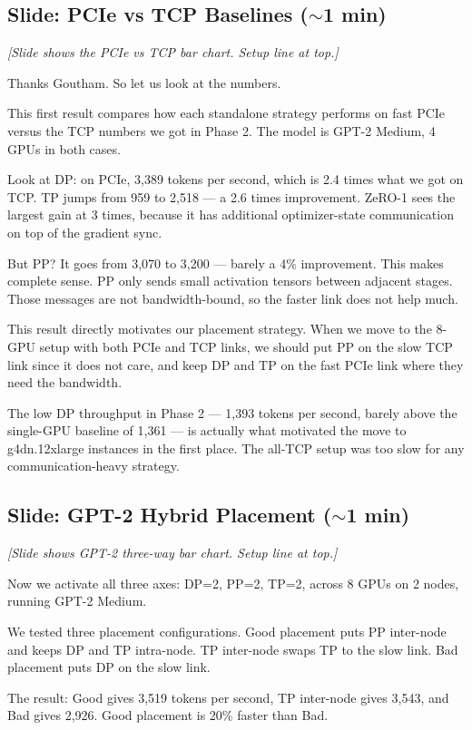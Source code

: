 \documentclass[11pt, a4paper]{article}
\begin{document}
\subsection{Slide: PCIe vs TCP Baselines ($\sim$1 min)}
\textit{[Slide shows the PCIe vs TCP bar chart. Setup line at top.]}

Thanks Goutham. So let us look at the numbers.

This first result compares how each standalone strategy performs on fast PCIe versus the TCP numbers we got in Phase 2. The model is GPT-2 Medium, 4 GPUs in both cases.

Look at DP: on PCIe, 3,389 tokens per second, which is 2.4 times what we got on TCP. TP jumps from 959 to 2,518 --- a 2.6 times improvement. ZeRO-1 sees the largest gain at 3 times, because it has additional optimizer-state communication on top of the gradient sync.

But PP? It goes from 3,070 to 3,200 --- barely a 4\% improvement. This makes complete sense. PP only sends small activation tensors between adjacent stages. Those messages are not bandwidth-bound, so the faster link does not help much.

This result directly motivates our placement strategy. When we move to the 8-GPU setup with both PCIe and TCP links, we should put PP on the slow TCP link since it does not care, and keep DP and TP on the fast PCIe link where they need the bandwidth.

The low DP throughput in Phase 2 --- 1,393 tokens per second, barely above the single-GPU baseline of 1,361 --- is actually what motivated the move to g4dn.12xlarge instances in the first place. The all-TCP setup was too slow for any communication-heavy strategy.

\subsection{Slide: GPT-2 Hybrid Placement ($\sim$1 min)}
\textit{[Slide shows GPT-2 three-way bar chart. Setup line at top.]}

Now we activate all three axes: DP=2, PP=2, TP=2, across 8 GPUs on 2 nodes, running GPT-2 Medium.

We tested three placement configurations. Good placement puts PP inter-node and keeps DP and TP intra-node. TP inter-node swaps TP to the slow link. Bad placement puts DP on the slow link.

The result: Good gives 3,519 tokens per second, TP inter-node gives 3,543, and Bad gives 2,926. Good placement is 20\% faster than Bad.
\end{document}
